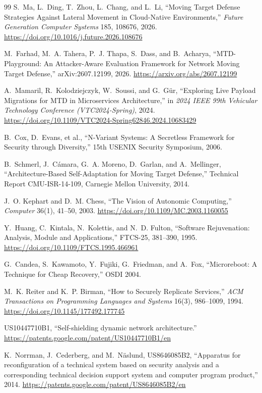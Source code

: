 \documentclass[11pt,letterpaper]{article}
\begin{document}
\begin{thebibliography}{99}
 S.~Ma, L.~Ding, T.~Zhou, L.~Chang, and L.~Li, ``Moving Target Defense Strategies Against Lateral Movement in Cloud-Native Environments,'' \emph{Future Generation Computer Systems} 185, 108676, 2026. \url{https://doi.org/10.1016/j.future.2026.108676}

 M.~Farhad, M.~A. Tahera, P.~J. Thapa, S.~Dass, and B.~Acharya, ``MTD-Playground: An Attacker-Aware Evaluation Framework for Network Moving Target Defense,'' arXiv:2607.12199, 2026. \url{https://arxiv.org/abs/2607.12199}

 A.~Mamaril, R.~Kolodziejczyk, W.~Soussi, and G.~G\"ur, ``Exploring Live Payload Migrations for MTD in Microservices Architecture,'' in \emph{2024 IEEE 99th Vehicular Technology Conference (VTC2024-Spring)}, 2024. \url{https://doi.org/10.1109/VTC2024-Spring62846.2024.10683429}

 B.~Cox, D.~Evans, et al., ``N-Variant Systems: A Secretless Framework for Security through Diversity,'' 15th USENIX Security Symposium, 2006.

 B.~Schmerl, J.~C\'amara, G.~A. Moreno, D.~Garlan, and A.~Mellinger, ``Architecture-Based Self-Adaptation for Moving Target Defense,'' Technical Report CMU-ISR-14-109, Carnegie Mellon University, 2014.

 J.~O. Kephart and D.~M. Chess, ``The Vision of Autonomic Computing,'' \emph{Computer} 36(1), 41--50, 2003. \url{https://doi.org/10.1109/MC.2003.1160055}

 Y.~Huang, C.~Kintala, N.~Kolettis, and N.~D. Fulton, ``Software Rejuvenation: Analysis, Module and Applications,'' FTCS-25, 381--390, 1995. \url{https://doi.org/10.1109/FTCS.1995.466961}

 G.~Candea, S.~Kawamoto, Y.~Fujiki, G.~Friedman, and A.~Fox, ``Microreboot: A Technique for Cheap Recovery,'' OSDI 2004.

 M.~K. Reiter and K.~P. Birman, ``How to Securely Replicate Services,'' \emph{ACM Transactions on Programming Languages and Systems} 16(3), 986--1009, 1994. \url{https://doi.org/10.1145/177492.177745}

 US10447710B1, ``Self-shielding dynamic network architecture.'' \url{https://patents.google.com/patent/US10447710B1/en}

 K.~Norrman, J.~Cederberg, and M.~N\"aslund, US8646085B2, ``Apparatus for reconfiguration of a technical system based on security analysis and a corresponding technical decision support system and computer program product,'' 2014. \url{https://patents.google.com/patent/US8646085B2/en}


\end{thebibliography}
\end{document}
